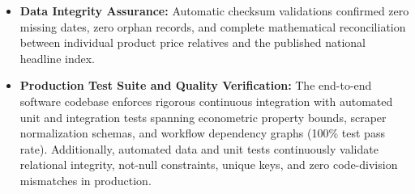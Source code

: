 \begin{itemize}
    \item \textbf{Data Integrity Assurance:} Automatic checksum validations confirmed zero missing dates, zero orphan records, and complete mathematical reconciliation between individual product price relatives and the published national headline index.
    \item \textbf{Production Test Suite and Quality Verification:} The end-to-end software codebase enforces rigorous continuous integration with automated unit and integration tests spanning econometric property bounds, scraper normalization schemas, and workflow dependency graphs (100\% test pass rate). Additionally, automated data and unit tests continuously validate relational integrity, not-null constraints, unique keys, and zero code-division mismatches in production.
\end{itemize}




